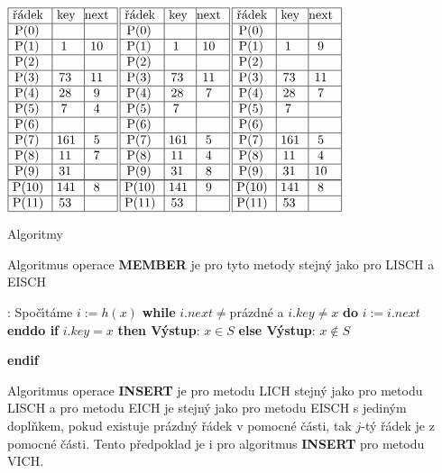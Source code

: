 $\vbox {\hbox{\vtop{\offinterlineskip\halign{\strut\vrule\ # & \vrule\ # & \vrule\hfil # \hfil\vrule\cr\noalign{\hrule}\v r\'adek & key & next \hfil\cr\noalign{\hrule}P(0) & &\hfill \cr\noalign{\hrule}P(1) & 1 & 10 \cr\noalign{\hrule}P(2) & &\hfill \cr\noalign{\hrule}P(3) & 73 & 11 \cr\noalign{\hrule}P(4) & 28 & 9 \cr\noalign{\hrule}P(5) & 7 & 4 \cr\noalign{\hrule}P(6) &  &\hfill \cr\noalign{\hrule}P(7) & 161 & 5 \cr\noalign{\hrule}P(8) & 11 & 7 \cr\noalign{\hrule}P(9) & 31 &\hfill \cr\noalign{\hrule}\noalign{\hrule}P(10) & 141 & 8 \cr\noalign{\hrule}P(11) & 53 & \hfill \cr\noalign{\hrule}}}\,\vtop{\offinterlineskip\halign{\strut\vrule\ # & \vrule\ # & \vrule\hfil# \hfil\vrule\cr\noalign{\hrule}\v r\'adek & key & next \hfil\cr\noalign{\hrule}P(0) & &\hfill \cr\noalign{\hrule}P(1) & 1 & 10 \cr\noalign{\hrule}P(2) & &\hfill \cr\noalign{\hrule}P(3) & 73 & 11 \cr\noalign{\hrule}P(4) & 28 & 7 \cr\noalign{\hrule}P(5) & 7 & \hfill \cr\noalign{\hrule}P(6) &  &\hfill \cr\noalign{\hrule}P(7) & 161 & 5 \cr\noalign{\hrule}P(8) & 11 & 4 \cr\noalign{\hrule}P(9) & 31 & 8 \cr\noalign{\hrule}\noalign{\hrule}P(10) & 141 & 9 \cr\noalign{\hrule}P(11) & 53 & \hfill \cr\noalign{\hrule}}}\,\vtop{\offinterlineskip\halign {\strut\vrule\ # & \vrule\ # & \vrule \hfil # \hfil \vrule\cr\noalign{\hrule}\v r\'adek & key & next \hfil \cr\noalign{\hrule}P(0) & &\hfill \cr\noalign{\hrule}P(1) & 1 & 9 \cr\noalign{\hrule}P(2) & &\hfill \cr\noalign{\hrule}P(3) & 73 & 11 \cr\noalign{\hrule}P(4) & 28 & 7 \cr\noalign{\hrule}P(5) & 7 & \hfill \cr\noalign{\hrule}P(6) & & \hfill \cr\noalign{\hrule}P(7) & 161 & 5 \cr\noalign{\hrule}P(8) & 11 & 4  \cr\noalign{\hrule}P(9) & 31 & 10 \cr\noalign{\hrule}\noalign{\hrule}P(10) & 141 & 8 \cr\noalign{\hrule}P(11) & 53 & \hfill \cr\noalign{\hrule}}}}}$
\medskip

\subhead
Algoritmy
\endsubhead
\smallskip

\flushpar Algoritmus operace {\bf MEMBER} je pro tyto metody 
stejn\'y jako pro LISCH a EISCH
\bigskip

:\newline 
Spo\v c\'\i t\'ame $i:=h\left(x\right)$\newline 
{\bf while} $i.next\ne$pr\'azdn\'e a $i.key\ne x$ {\bf do} $i:=i.
next$ {\bf enddo\newline 
if} $i.key=x$ {\bf then V\'ystup}: $x\in S$ {\bf else V\'ystup}: $
x\notin S$ {\bf endif
\medskip

}\flushpar Algoritmus operace {\bf INSERT} je pro metodu LICH stejn\'y 
jako pro metodu LISCH a pro metodu EICH je stejn\'y jako 
pro metodu EISCH s jedin\'ym dopl\v nkem, pokud existuje 
pr\'azdn\'y \v r\'adek v pomocn\'e \v c\'asti, tak $j$-t\'y \v r\'adek je z 
pomocn\'e \v c\'asti. Tento p\v redpoklad je i pro algoritmus 
{\bf INSERT} pro metodu VICH.
\medskip

